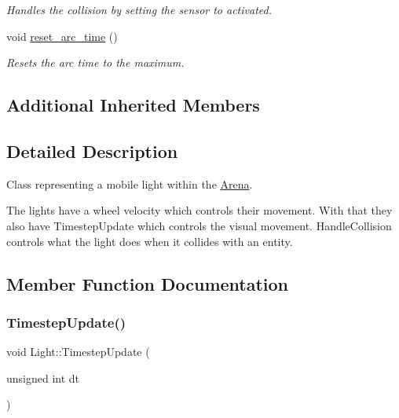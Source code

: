 \begin{DoxyCompactItemize}
\begin{DoxyCompactList}\small\item\em Handles the collision by setting the sensor to activated. \end{DoxyCompactList}\item 
\mbox{\label{class_light_ac4b1010649835f0572e5215a8b58d76d}} 
void \mbox{\hyperlink{class_light_ac4b1010649835f0572e5215a8b58d76d}{reset\+\_\+arc\+\_\+time}} ()
\begin{DoxyCompactList}\small\item\em Resets the arc time to the maximum. \end{DoxyCompactList}\end{DoxyCompactItemize}
\subsection*{Additional Inherited Members}


\subsection{Detailed Description}
Class representing a mobile light within the \mbox{\hyperlink{class_arena}{Arena}}. 

The lights have a wheel velocity which controls their movement. With that they also have Timestep\+Update which controls the visual movement. Handle\+Collision controls what the light does when it collides with an entity. 

\subsection{Member Function Documentation}
\mbox{\label{class_light_a97934eec7489f9b072534f5e30a2d90d}} 
\subsubsection{\texorpdfstring{Timestep\+Update()}{TimestepUpdate()}}
{\footnotesize\ttfamily void Light\+::\+Timestep\+Update (\begin{DoxyParamCaption}\item[{unsigned int}]{dt }\end{DoxyParamCaption})\hspace{0.3cm}{\ttfamily [override]}}



